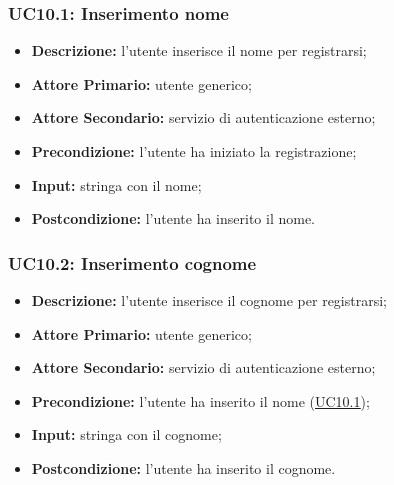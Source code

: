 \subsubsection{UC10.1: Inserimento nome}
\label{sec:UC10.1}
\begin{itemize}
    \item \textbf{Descrizione:} l'utente inserisce il nome per registrarsi;
    \item \textbf{Attore Primario:} utente generico;
    \item \textbf{Attore Secondario:} servizio di autenticazione esterno;
    \item \textbf{Precondizione:} l'utente ha iniziato la registrazione;
    \item \textbf{Input:} stringa con il nome;
    \item \textbf{Postcondizione:} l'utente ha inserito il nome. 
\end{itemize}

\subsubsection{UC10.2: Inserimento cognome}
\label{sec:UC10.2}
\begin{itemize}
    \item \textbf{Descrizione:} l'utente inserisce il cognome per registrarsi;
    \item \textbf{Attore Primario:} utente generico;
    \item \textbf{Attore Secondario:} servizio di autenticazione esterno;
    \item \textbf{Precondizione:} l'utente ha inserito il nome (\hyperref[sec:UC10.1]{\underline{UC10.1}});
    \item \textbf{Input:} stringa con il cognome;
    \item \textbf{Postcondizione:} l'utente ha inserito il cognome. 
\end{itemize}

